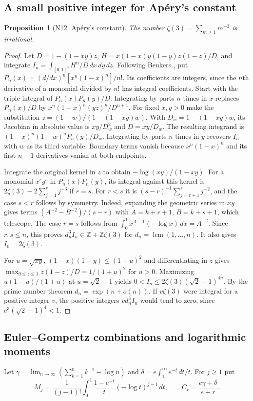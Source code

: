 \documentclass[11pt,a4paper]{article}
\newtheorem{proposition}[theorem]{Proposition}
\theoremstyle{definition}
\theoremstyle{remark}
\begin{document}
\subsection{A small positive integer for Ap\'ery's constant}
\par\hypertarget{cat-N12}{}\label{page:N12}
\begin{proposition}[N12. Ap\'ery's constant]
The number $\zeta(3)=\sum_{m\ge1}m^{-3}$ is irrational.
\end{proposition}
\begin{proof}
Let $D=1-(1-xy)z$, $H=x(1-x)y(1-y)z(1-z)/D$, and integrate
$I_n=\int_{[0,1]^3}H^n/D\,dx\,dy\,dz$. Following Beukers
\cite{nBeuk}, put $P_n(x)=(d/dx)^n[x^n(1-x)^n]/n!$.
Its coefficients are integers, since the $n$th derivative of a monomial
divided by $n!$ has integral coefficients. Start with the triple integral
of $P_n(x)P_n(y)/D$. Integrating by parts $n$ times in $x$ replaces
$P_n(x)/D$ by $x^n(1-x)^n(yz)^n/D^{n+1}$. For fixed $x,y>0$ make
the substitution $z=(1-w)/(1-(1-xy)w)$. With
$D_w=1-(1-xy)w$, its Jacobian in absolute value is $xy/D_w^2$
and $D=xy/D_w$. The resulting integrand is
$(1-x)^n(1-w)^n P_n(y)/D_w$. Integrating by parts $n$ times in
$y$ recovers $I_n$ with $w$ as its third variable. Boundary terms vanish
because $x^n(1-x)^n$ and its first $n-1$ derivatives vanish at both endpoints.

Integrate the original kernel in $z$ to obtain $-\log(xy)/(1-xy)$.
For a monomial $x^r y^s$ in $P_n(x)P_n(y)$, its integral against this
kernel is $2\zeta(3)-2\sum_{j=1}^r j^{-3}$ if $r=s$.
For $r<s$ it is $(s-r)^{-1}\sum_{j=r+1}^s j^{-2}$, and the case
$s<r$ follows by symmetry. Indeed, expanding the geometric series in
$xy$ gives terms $(A^{-2}-B^{-2})/(s-r)$ with $A=k+r+1$,
$B=k+s+1$, which telescope. The case $r=s$ follows from
$\int_0^1 x^{A-1}(-\log x)\,dx=A^{-2}$. Since $r,s\le n$,
this proves $d_n^3 I_n\in\mathbb Z+\mathbb Z\zeta(3)$ for
$d_n=\operatorname{lcm}(1,\ldots,n)$. It also gives $I_0=2\zeta(3)$.

For $u=\sqrt{xy}$, $(1-x)(1-y)\le(1-u)^2$ and differentiating in $z$
gives $\max_{0\le z\le1}z(1-z)/D=1/(1+u)^2$ for $u>0$.
Maximizing $u(1-u)/(1+u)$ at $u=\sqrt2-1$ yields
$0<I_n\le 2\zeta(3)(\sqrt2-1)^{4n}$. By the prime number theorem
$d_n=\exp(n+o(n))$. If $v\zeta(3)$ were integral for a positive
integer $v$, the positive integers $vd_n^3I_n$ would tend to zero,
since $e^3(\sqrt2-1)^4<1$.
\end{proof}

\subsection{Euler--Gompertz combinations and logarithmic moments}
Let $\gamma=\lim_{n\to\infty}(\sum_{k=1}^n k^{-1}-\log n)$ and
$\delta=e\int_1^\infty e^{-t}\,dt/t$. For $j\ge1$ put
\[
 M_j=\frac{1}{(j-1)!}\int_0^1
         \frac{1-e^{-t}}t(-\log t)^{j-1}\,dt,\qquad
 C_r=\frac{e\gamma+\delta}{e+r}.
\]
\end{document}
